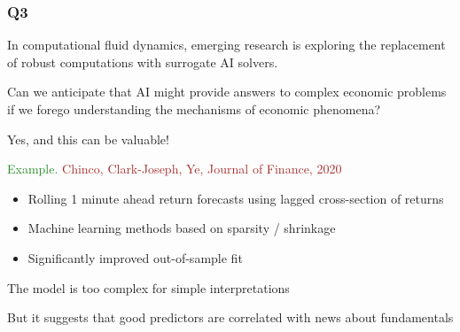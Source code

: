 \documentclass[
    xcolor={svgnames,dvipsnames},
    hyperref={colorlinks, citecolor=DeepPink4, linkcolor=DarkRed, urlcolor=DarkBlue}
    ]{beamer}  %
\newcommand{\Eg}{\textcolor{ForestGreen}{Example. }}
\newcommand{\brown}[1]{\textcolor{Brown}{\sf #1}}
\newcommand{\1}{\mathbbm 1}
\begin{document}
\begin{frame}
    \frametitle{Q3}
    
    In computational fluid dynamics, emerging research is exploring the
    replacement of robust computations with surrogate AI solvers. 

            \vspace{0.3em}
            \vspace{0.3em}
            \vspace{0.3em}
            \vspace{0.3em}
            \vspace{0.3em}
    Can we anticipate that AI might provide answers to complex economic
    problems if we forego understanding the mechanisms of economic phenomena?

\end{frame}

\begin{frame}
    
    Yes, and this can be valuable!

            \vspace{0.3em}
    \Eg \brown{Chinco, Clark-Joseph, Ye, Journal of Finance, 2020}

    \begin{itemize}
        \item Rolling 1 minute ahead return forecasts using lagged
            cross-section of returns
            \vspace{0.3em}
        \item Machine learning methods based on sparsity / shrinkage
            \vspace{0.3em}
        \item Significantly improved out-of-sample fit
    \end{itemize}

            \vspace{0.3em}
            \vspace{0.3em}
            \vspace{0.3em}
    The model is too complex for simple interpretations

            \vspace{0.3em}
            \vspace{0.3em}
    But it suggests that good predictors are correlated with news about
    fundamentals

\end{frame}
\end{document}
